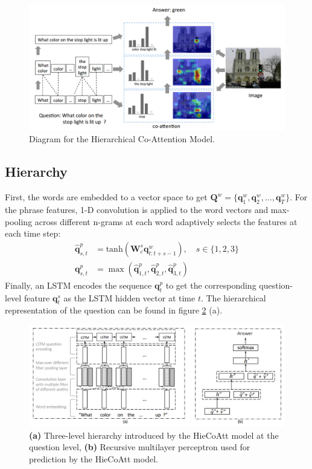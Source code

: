 \documentclass{article}
\begin{document}
    \begin{figure}[ht]
    	\centering
            \includegraphics[width=0.75\linewidth]{coattModel.PNG}
    	\caption{Diagram for the Hierarchical Co-Attention Model.}
    	\label{coattModel}
    \end{figure}

\subsection{Hierarchy}
First, the words are embedded to a vector space to get $\bm{Q}^w=\{\bm{q}_1^w, \bm{q}_2^w, \ldots, \bm{q}_T^w\}$. For the phrase features, 1-D convolution is applied to the word vectors and max-pooling across different n-grams at each word adaptively selects the features at each time step:
\begin{align*}
    \hat{\bm{q}}_{s,t}^p &= \text{tanh}(\bm{W}_c^s\bm{q}_{t:t+s-1}^w), \quad s\in \{1, 2, 3\}\\
    \bm{q}_{s,t}^p &= \max(\hat{\bm{q}}_{1,t}^p, \hat{\bm{q}}_{2,t}^p, \hat{\bm{q}}_{3,t}^p)
\end{align*}
Finally, an LSTM encodes the sequence $\bm{q}_t^p$ to get the corresponding question-level feature $\bm{q}_t^s$ as the LSTM hidden vector at time $t$. The hierarchical representation of the question can be found in figure \ref{hierarchy+prediction} (a).

    \begin{figure}[ht]
    	\centering
            \includegraphics[width=1.0\linewidth]{hierarchy+prediction.PNG}
    	\caption{\textbf{(a)} Three-level hierarchy introduced by the HieCoAtt model at the question level, \textbf{(b)} Recursive multilayer perceptron used for prediction by the HieCoAtt model.}
    	\label{hierarchy+prediction}
    \end{figure}
\end{document}
